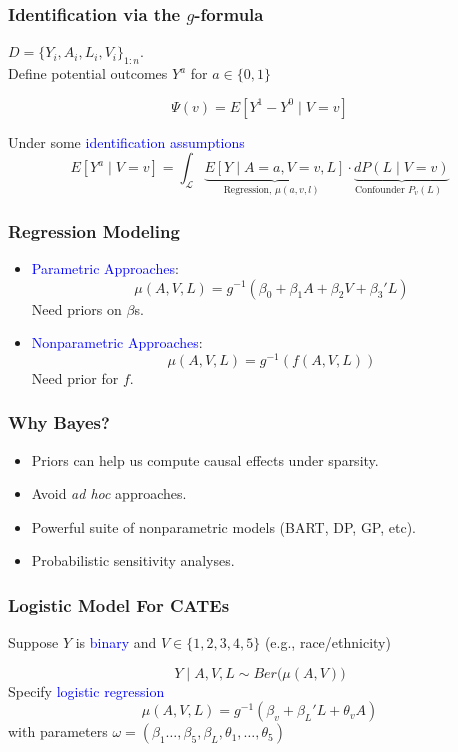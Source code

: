 \documentclass[xcolor=x11names,compress]{beamer}
\renewcommand{\(}{\begin{columns}}
\renewcommand{\)}{\end{columns}}
\newcommand{\<}[1]{\begin{column}{#1}}
\renewcommand{\>}{\end{column}}
\begin{document}
\begin{frame}
	\frametitle{Identification via the $g$-formula}
	$D = \{Y_i, A_i, L_i, V_i \}_{1:n}$. \\ 
	Define potential outcomes $Y^a$ for $a\in\{0,1\}$
	
	\pause
	$$\Psi(v) =  E[ Y^1 - Y^0 \mid V=v ]$$
	
	\pause 
	Under some \textcolor{blue}{identification assumptions}
	$$ E[Y^a \mid V=v] = \int_{\mathcal{L}} \underbrace{E[ Y\mid A=a, V=v, L ]}_{\text{Regression, $\mu(a, v, l)$ }} \cdot \underbrace{dP(L \mid V=v )}_{ \text{Confounder $P_v(L)$ } }  $$
\end{frame}

\begin{frame}
	\frametitle{Regression Modeling}

\begin{itemize}
	\item	\textcolor{blue}{Parametric Approaches}:
	$$ \mu(A, V, L) = g^{-1}( \beta_0 +  \beta_1 A + \beta_2 V + \beta_3' L ) $$
	Need priors on $\beta$s.
	
	\item \textcolor{blue}{Nonparametric Approaches}:
	$$ \mu(A, V, L) = g^{-1}( f(A, V,  L)   ) $$	
	Need prior for $f$.
\end{itemize}
	
\end{frame}

\begin{frame}
	\frametitle{Why Bayes?}
	
	\begin{itemize}
		\item Priors can help us compute causal effects under sparsity.
		\item Avoid \textit{ad hoc} approaches.
		\item Powerful suite of nonparametric models (BART, DP, GP, etc).
		\item Probabilistic sensitivity analyses.
	\end{itemize}
\end{frame}

\begin{frame}
	\frametitle{Logistic Model For CATEs}
	Suppose $Y$ is \textcolor{blue}{binary} and $V\in\{1,2,3,4,5 \} $ (e.g., race/ethnicity)
	
	$$ Y \mid A, V, L \sim Ber \big( \mu(A, V) \big) $$
	\pause
	Specify \textcolor{blue}{logistic regression}
	$$ \mu(A, V, L) = g^{-1}( \beta_v + \beta_L' L +  \theta_v A ) $$
	with parameters $\omega = ( \beta_1\dots, \beta_5, \beta_L, \theta_1, \dots,\theta_5 )$ 
\end{frame}
\end{document}
